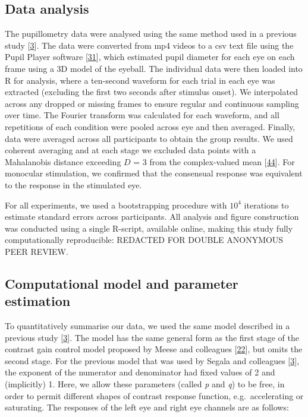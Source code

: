 \documentclass[
]{article}
\begin{document}
\hypertarget{data-analysis}{%
\subsection{Data analysis}\label{data-analysis}}

The pupillometry data were analysed using the same method used in a previous study {[}\protect\hyperlink{ref-Segala2023}{3}{]}. The data were converted from mp4 videos to a csv text file using the Pupil Player software {[}\protect\hyperlink{ref-Kassner2014}{31}{]}, which estimated pupil diameter for each eye on each frame using a 3D model of the eyeball. The individual data were then loaded into R for analysis, where a ten-second waveform for each trial in each eye was extracted (excluding the first two seconds after stimulus onset). We interpolated across any dropped or missing frames to ensure regular and continuous sampling over time. The Fourier transform was calculated for each waveform, and all repetitions of each condition were pooled across eye and then averaged. Finally, data were averaged across all participants to obtain the group results. We used coherent averaging and at each stage we excluded data points with a Mahalanobis distance exceeding \(D\) = 3 from the complex-valued mean {[}\protect\hyperlink{ref-Baker2021}{44}{]}. For monocular stimulation, we confirmed that the consensual response was equivalent to the response in the stimulated eye.

For all experiments, we used a bootstrapping procedure with \ensuremath{10^{4}} iterations to estimate standard errors across participants. All analysis and figure construction was conducted using a single R-script, available online, making this study fully computationally reproducible: REDACTED FOR DOUBLE ANONYMOUS PEER REVIEW.

\hypertarget{computational-model-and-parameter-estimation}{%
\subsection{Computational model and parameter estimation}\label{computational-model-and-parameter-estimation}}

To quantitatively summarise our data, we used the same model described in a previous study {[}\protect\hyperlink{ref-Segala2023}{3}{]}. The model has the same general form as the first stage of the contrast gain control model proposed by Meese and colleagues {[}\protect\hyperlink{ref-Meese2006}{22}{]}, but omits the second stage. For the previous model that was used by Segala and colleagues {[}\protect\hyperlink{ref-Segala2023}{3}{]}, the exponent of the numerator and denominator had fixed values of 2 and (implicitly) 1. Here, we allow these parameters (called \emph{p} and \emph{q}) to be free, in order to permit different shapes of contrast response function, e.g.~accelerating or saturating. The responses of the left eye and right eye channels are as follows:
\end{document}
